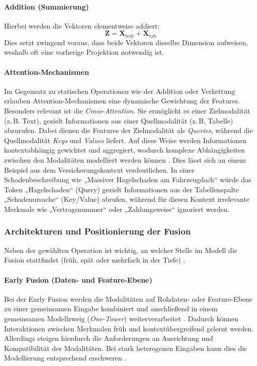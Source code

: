 \paragraph{Addition (Summierung)}
Hierbei werden die Vektoren elementweise addiert:
\begin{equation}
    \mathbf{Z} = \mathbf{X}_{\text{text}} + \mathbf{X}_{\text{tab}}
\end{equation}
Dies setzt zwingend voraus, dass beide Vektoren dieselbe Dimension aufweisen, weshalb oft eine vorherige Projektion notwendig ist.

\paragraph{Attention-Mechanismen}
Im Gegensatz zu statischen Operationen wie der Addition oder Verkettung erlauben Attention-Mechanismen eine dynamische Gewichtung der Features.
Besonders relevant ist die \textit{Cross-Attention}. Sie ermöglicht es einer Zielmodalität (z.\,B. Text), gezielt Informationen aus einer Quellmodalität (z.\,B. Tabelle) abzurufen. Dabei dienen die Features der Zielmodalität als \textit{Queries}, während die Quellmodalität \textit{Keys} und \textit{Values} liefert. Auf diese Weise werden Informationen kontextabhängig gewichtet und aggregiert, wodurch komplexe Abhängigkeiten zwischen den Modalitäten modelliert werden können \cite{Li2024}. 
Dies lässt sich an einem Beispiel aus dem Versicherungskontext verdeutlichen. In einer Schadenbeschreibung wie „Massiver Hagelschaden am Fahrzeugdach“ würde das Token „Hagelschaden“ (Query) gezielt Informationen aus der Tabellenspalte „Schadenursache“ (Key/Value) abrufen, während für diesen Kontext irrelevante Merkmale wie „Vertragsnummer“ oder „Zahlungsweise“ ignoriert werden.

\newpage
\subsubsection{Architekturen und Positionierung der Fusion}

Neben der gewählten Operation ist wichtig, an welcher Stelle im Modell die Fusion stattfindet (früh, spät oder mehrfach in der Tiefe) \cite{Jiao2024, Li2024, Baltrusaitis2019}.

\paragraph{Early Fusion (Daten- und Feature-Ebene)}
Bei der Early Fusion werden die Modalitäten auf Rohdaten- oder Feature-Ebene zu einer gemeinsamen Eingabe kombiniert und anschließend in einem gemeinsamen Modellzweig (\textit{One-Tower}) weiterverarbeitet \cite{Jiao2024, Li2024, Baltrusaitis2019}. Dadurch können Interaktionen zwischen Merkmalen früh und kontextübergreifend gelernt werden. Allerdings steigen hierdurch die Anforderungen an Ausrichtung und Kompatibilität der Modalitäten. Bei stark heterogenen Eingaben kann dies die Modellierung entsprechend erschweren \cite{Baltrusaitis2019, Jiao2024}.

